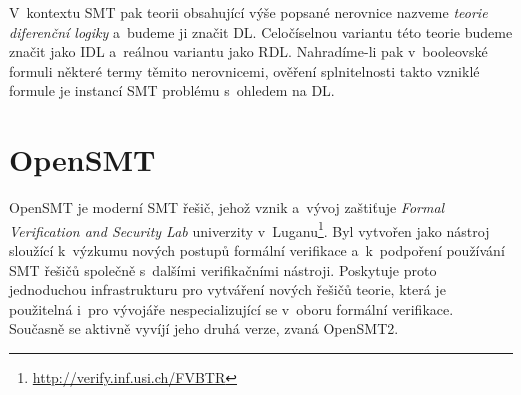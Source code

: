 V~kontextu SMT pak teorii obsahující výše popsané nerovnice nazveme \emph{teorie diferenční logiky} a~budeme ji značit DL. Celočíselnou variantu této teorie budeme značit jako IDL a~reálnou variantu jako RDL. Nahradíme-li pak v~booleovské formuli některé termy těmito nerovnicemi, ověření splnitelnosti takto vzniklé formule je instancí SMT problému s~ohledem na DL.

\section{OpenSMT}

OpenSMT je moderní SMT řešič, jehož vznik a~vývoj zaštiťuje \emph{Formal Verification and Security Lab} univerzity v~Luganu\footnote{\url{http://verify.inf.usi.ch/FVBTR}}. Byl vytvořen jako nástroj sloužící k~výzkumu nových postupů formální verifikace a~k~podpoření používání SMT řešičů společně s~dalšími verifikačními nástroji. Poskytuje proto jednoduchou infrastrukturu pro vytváření nových řešičů teorie, která je použitelná i~pro vývojáře nespecializující se v~oboru formální verifikace. Současně se aktivně vyvíjí jeho druhá verze, zvaná OpenSMT2.

